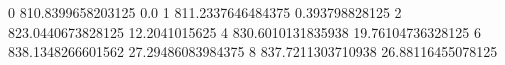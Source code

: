 0 810.8399658203125 0.0
1 811.2337646484375 0.393798828125
2 823.0440673828125 12.2041015625
4 830.6010131835938 19.76104736328125
6 838.1348266601562 27.29486083984375
8 837.7211303710938 26.88116455078125
